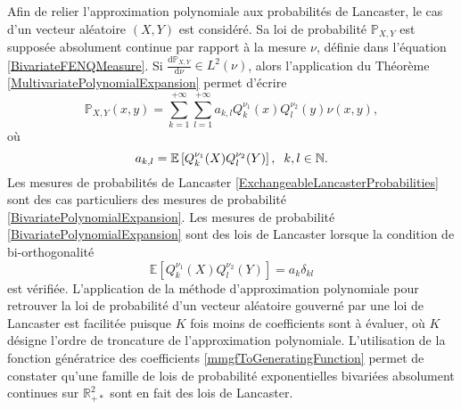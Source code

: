 Afin de relier l'approximation polynomiale aux probabilités de Lancaster, le cas d'un vecteur aléatoire $(X,Y)$ est considéré. Sa loi de probabilité $\mathbb{P}_{X,Y}$ est supposée absolument continue par rapport à la mesure $\nu$, définie dans l'équation \eqref{BivariateFENQMeasure}. Si $\frac{\text{d}\mathbb{P}_{X,Y}}{\text{d}\nu}\in L^{2}(\nu)$, alors l'application du Théorème \ref{MultivariatePolynomialExpansion} permet d'écrire 
\begin{equation}\label{BivariatePolynomialExpansion}
\mathbb{P}_{X,Y}(x,y)=\sum_{k=1}^{+\infty}\sum_{l=1}^{+\infty}a_{k,l}Q_{k}^{\nu_{1}}(x)Q_{l}^{\nu_{2}}(y)\nu(x,y),
\end{equation} 
où
\begin{equation*}
a_{k,l}=\mathbb{E}\left[Q^{\nu_{1}}_{k}(X)Q^{\nu_{2}}_{l}(Y)\right],\hspace{0.2cm} k,l\in\mathbb{N}.
\end{equation*}
Les mesures de probabilités de Lancaster \eqref{ExchangeableLancasterProbabilities} sont des cas particuliers des mesures de probabilité \eqref{BivariatePolynomialExpansion}. Les mesures de probabilité  \eqref{BivariatePolynomialExpansion} sont des lois de Lancaster lorsque la condition de bi-orthogonalité
\begin{equation}
\mathbb{E}\left[Q^{\nu_{1}}_{k}(X)Q^{\nu_{2}}_{l}(Y)\right]=a_{k}\delta_{kl}
\end{equation}
est vérifiée. L'application de la méthode d'approximation polynomiale pour retrouver la loi de probabilité d'un vecteur aléatoire gouverné par une loi de Lancaster est facilitée puisque $K$ fois moins de coefficients sont à évaluer, où $K$ désigne l\rq{}ordre de troncature de l\rq{}approximation polynomiale. L'utilisation de la fonction génératrice des coefficients \eqref{mmgfToGeneratingFunction} permet de constater qu'une famille de lois de probabilité exponentielles bivariées absolument continues sur $\mathbb{R}_{+*}^{2}$ sont en fait des lois de Lancaster.
